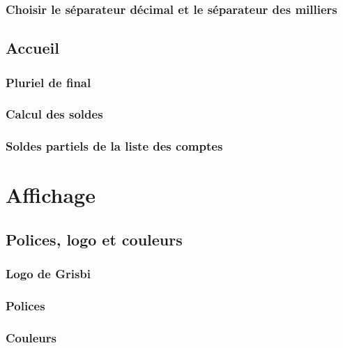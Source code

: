 \subsubsection{Choisir le séparateur décimal et le séparateur des milliers}

\subsection{Accueil\label{setup-general-home}}

\subsubsection{Pluriel de final\label{setup-general-home-final}}

\subsubsection{Calcul des soldes\label{setup-general-home-balance}}

\subsubsection{Soldes partiels de la liste des comptes\label{setup-general-home-partBalance}}


\section{Affichage\label{setup-display}}


\subsection{Polices, logo et couleurs\label{setup-display-logo}}


\subsubsection{Logo de Grisbi\label{setup-display-logo-icon}}


\subsubsection{Polices\label{setup-display-logo-fonts}}


\subsubsection{Couleurs\label{setup-display-logo-colors}}

